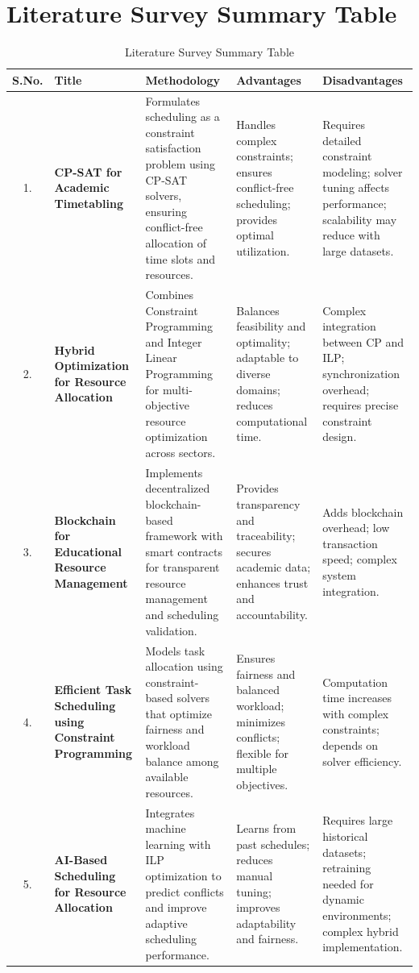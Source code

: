 \documentclass[a4paper, 12pt]{report}
\begin{document}
\section{Literature Survey Summary Table}
\begin{table}[htbp]
\caption{Literature Survey Summary Table}
\centering
\small %
\renewcommand{\arraystretch}{1.3}
\setlength{\tabcolsep}{3pt}
\begin{tabular}{|c|p{2.8cm}|p{3.8cm}|p{3.8cm}|p{3.8cm}|}
\hline
\textbf{S.No.} & \textbf{Title} & \textbf{Methodology} & \textbf{Advantages} & \textbf{Disadvantages} \\
\hline

1. & \textbf{CP-SAT for Academic Timetabling} &
Formulates scheduling as a constraint satisfaction problem using CP-SAT solvers, ensuring conflict-free allocation of time slots and resources. &
Handles complex constraints; ensures conflict-free scheduling; provides optimal utilization. &
Requires detailed constraint modeling; solver tuning affects performance; scalability may reduce with large datasets. \\
\hline

2. & \textbf{Hybrid Optimization for Resource Allocation } &
Combines Constraint Programming and Integer Linear Programming for multi-objective resource optimization across sectors. &
Balances feasibility and optimality; adaptable to diverse domains; reduces computational time. &
Complex integration between CP and ILP; synchronization overhead; requires precise constraint design. \\
\hline

3. & \textbf{Blockchain for Educational Resource Management } &
Implements decentralized blockchain-based framework with smart contracts for transparent resource management and scheduling validation. &
Provides transparency and traceability; secures academic data; enhances trust and accountability. &
Adds blockchain overhead; low transaction speed; complex system integration. \\
\hline

4. & \textbf{Efficient Task Scheduling using Constraint Programming} &
Models task allocation using constraint-based solvers that optimize fairness and workload balance among available resources. &
Ensures fairness and balanced workload; minimizes conflicts; flexible for multiple objectives. &
Computation time increases with complex constraints; depends on solver efficiency. \\
\hline

5. & \textbf{AI-Based Scheduling for Resource Allocation } &
Integrates machine learning with ILP optimization to predict conflicts and improve adaptive scheduling performance. &
Learns from past schedules; reduces manual tuning; improves adaptability and fairness. &
Requires large historical datasets; retraining needed for dynamic environments; complex hybrid implementation. \\
\hline
\end{tabular}
\label{tab:summary_srp}
\end{table}
\end{document}
